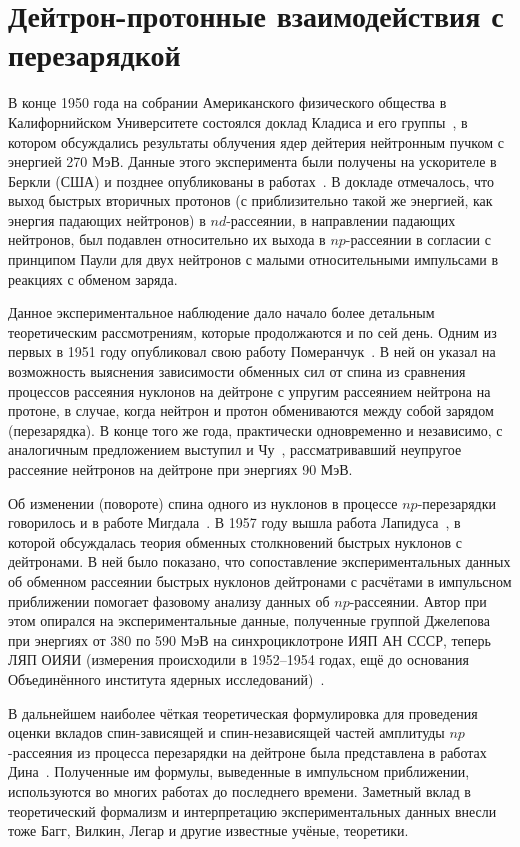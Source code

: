 \chapter{Дейтрон-протонные взаимодействия
  с перезарядкой}
В конце 1950 года на собрании Американского физического общества в
Калифорнийском Университете состоялся доклад Кладиса и его
группы~\cite{cladis50}, в котором обсуждались результаты облучения ядер дейтерия
нейтронным пучком с энергией 270 МэВ. Данные этого эксперимента были получены
на ускорителе в Беркли (США) и позднее опубликованы в
работах~\cite{cladis52,moyer52}. В докладе отмечалось, что выход быстрых
вторичных протонов (с приблизительно такой же энергией, как энергия падающих
нейтронов) в $nd$-рассеянии, в направлении падающих нейтронов, был подавлен
относительно их выхода в $np$-рассеянии в согласии с принципом Паули для двух
нейтронов с малыми относительными импульсами в реакциях с обменом заряда.

Данное экспериментальное наблюдение дало начало более детальным теоретическим
рассмотрениям, которые продолжаются и по сей день. Одним из первых в 1951 году
опубликовал свою работу Померанчук~\cite{pom51}.  В ней он указал на
возможность выяснения зависимости обменных сил от спина из сравнения процессов
рассеяния нуклонов на дейтроне с упругим рассеянием нейтрона на протоне, в
случае, когда нейтрон и протон обмениваются между собой зарядом (перезарядка). В
конце того же года, практически одновременно и независимо, с аналогичным
предложением выступил и Чу~\cite{chew51}, рассматривавший неупругое рассеяние
нейтронов на дейтроне при энергиях 90 МэВ.

Об изменении (повороте) спина одного из нуклонов в процессе $np$-перезарядки
говорилось и в работе Мигдала~\cite{mig55}. В 1957 году вышла работа
Лапидуса~\cite{lap57}, в которой обсуждалась теория обменных столкновений
быстрых нуклонов с дейтронами. В ней было показано, что сопоставление
экспериментальных данных об обменном рассеянии быстрых нуклонов дейтронами с
расчётами в импульсном приближении помогает фазовому анализу данных об
$np$-рассеянии. Автор при этом опирался на экспериментальные данные, полученные
группой Джелепова при энергиях от 380 по 590 МэВ на синхроциклотроне ИЯП АН
СССР, теперь ЛЯП ОИЯИ (измерения происходили в 1952--1954 годах, ещё до
основания Объединённого института ядерных
исследований)~\cite{dzelep56,dzelep58}.

В дальнейшем наиболее чёткая теоретическая формулировка для проведения оценки
вкладов спин-зависящей и спин-независящей частей амплитуды $np$-рассеяния из
процесса перезарядки на дейтроне была представлена в работах
Дина~\cite{dean72,dean72_2}. Полученные им формулы, выведенные в импульсном
приближении, используются во многих работах до последнего времени. Заметный
вклад в теоретический формализм и интерпретацию экспериментальных данных внесли
тоже Багг, Вилкин, Легар и другие известные учёные, теоретики.

